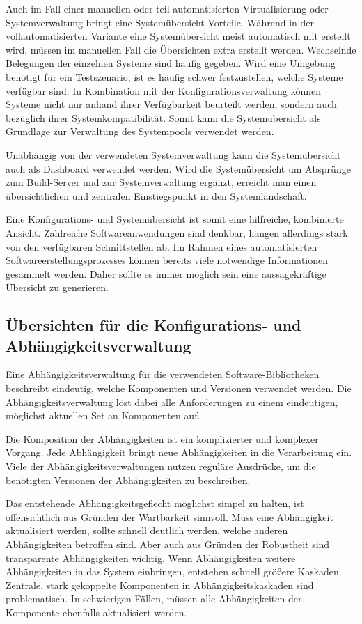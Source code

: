 Auch im Fall einer manuellen oder teil-automatisierten Virtualisierung oder Systemverwaltung bringt eine Systemübersicht Vorteile. Während in der vollautomatisierten Variante eine Systemübersicht meist automatisch mit erstellt wird, müssen im manuellen Fall die Übersichten extra erstellt werden. Wechselnde Belegungen der einzelnen Systeme sind häufig gegeben. Wird eine Umgebung benötigt für ein Testszenario, ist es häufig schwer festzustellen, welche Systeme verfügbar sind. In Kombination mit der Konfigurationsverwaltung können Systeme nicht nur anhand ihrer Verfügbarkeit beurteilt werden, sondern auch bezüglich ihrer Systemkompatibilität. Somit kann die Systemübersicht als Grundlage zur Verwaltung des Systempools verwendet werden.

Unabhängig von der verwendeten Systemverwaltung kann die Systemübersicht auch als Dashboard verwendet werden. Wird die Systemübersicht um Absprünge zum Build-Server und zur Systemverwaltung ergänzt, erreicht man einen übersichtlichen und zentralen Einstiegspunkt in den Systemlandschaft.

Eine Konfigurations- und Systemübersicht ist somit eine hilfreiche, kombinierte Ansicht. Zahlreiche Softwareanwendungen sind denkbar, hängen allerdings stark von den verfügbaren Schnittstellen ab. Im Rahmen eines automatisierten Softwareerstellungsprozesses können bereits viele notwendige Informationen gesammelt werden. Daher sollte es immer möglich sein eine aussagekräftige Übersicht zu generieren.

\subsection{Übersichten für die Konfigurations- und Abhängigkeitsverwaltung}

Eine Abhängigkeitsverwaltung für die verwendeten Software-Bibliotheken beschreibt eindeutig, welche Komponenten und Versionen verwendet werden. Die Abhängigkeitsverwaltung löst dabei alle Anforderungen zu einem eindeutigen, möglichst aktuellen Set an Komponenten auf. 

Die Komposition der Abhängigkeiten ist ein komplizierter und komplexer Vorgang. Jede Abhängigkeit bringt neue Abhängigkeiten in die Verarbeitung ein. Viele der Abhängigkeitsverwaltungen nutzen reguläre Ausdrücke, um die benötigten Versionen der Abhängigkeiten zu beschreiben.

Das entstehende Abhängigkeitsgeflecht möglichst simpel zu halten, ist offensichtlich aus Gründen der Wartbarkeit sinnvoll. Muss eine Abhängigkeit aktualisiert werden, sollte schnell deutlich werden, welche anderen Abhängigkeiten betroffen sind.
Aber auch aus Gründen der Robustheit sind transparente Abhängigkeiten wichtig. Wenn Abhängigkeiten weitere Abhängigkeiten in das System einbringen, entstehen schnell größere Kaskaden. Zentrale, stark gekoppelte Komponenten in Abhängigkeitskaskaden sind problematisch. In schwierigen Fällen, müssen alle Abhängigkeiten der Komponente ebenfalls aktualisiert werden.

